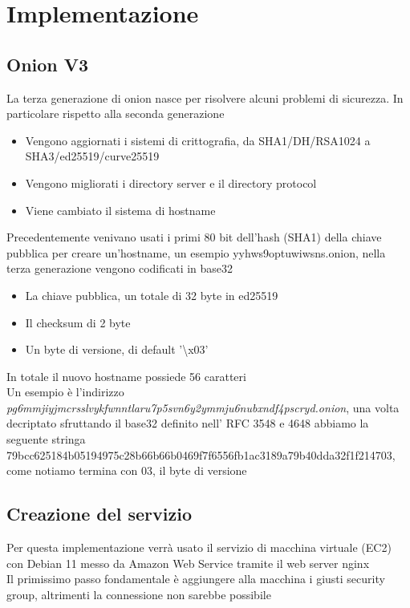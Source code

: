 \chapter{Implementazione}

\section{Onion V3}

La terza generazione di onion nasce per risolvere alcuni problemi di sicurezza. In particolare rispetto alla seconda generazione
\begin{itemize}
    \item Vengono aggiornati i sistemi di crittografia, da SHA1/DH/RSA1024 a SHA3/ed25519/curve25519
    \item Vengono migliorati i directory server e il directory protocol
    \item Viene cambiato il sistema di hostname
\end{itemize}
Precedentemente venivano usati i primi 80 bit dell'hash (SHA1) della chiave pubblica per creare un'hostname, un esempio yyhws9optuwiwsns.onion, nella terza generazione vengono codificati in base32
\begin{itemize}
    \item La chiave pubblica, un totale di 32 byte in ed25519
    \item Il checksum di 2 byte
    \item Un byte di versione, di default '\textbackslash x03' 
\end{itemize}
In totale il nuovo hostname possiede 56 caratteri \cite{Torv3} \\
Un esempio è l'indirizzo \emph{pg6mmjiyjmcrsslvykfwnntlaru7p5svn6y2ymmju6nubxndf4pscryd.onion}, una volta decriptato sfruttando il base32 definito nell' RFC 3548 e 4648 abbiamo la seguente stringa 79bcc625184b05194975c28b66b66b0469f7f6556fb1ac3189a79b40dda32f1f214703, come notiamo termina con 03, il byte di versione

\section{Creazione del servizio}
Per questa implementazione verrà usato il servizio di macchina virtuale (EC2) con Debian 11 messo da Amazon Web Service tramite il web server nginx \\
Il primissimo passo fondamentale è aggiungere alla macchina i giusti security group, altrimenti la connessione non sarebbe possibile

